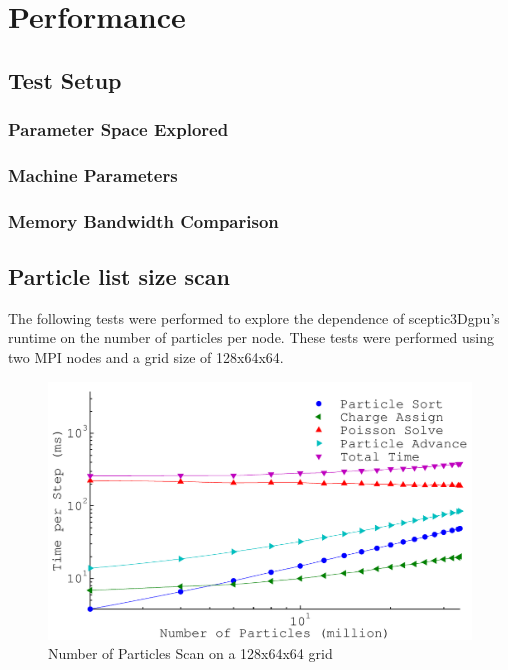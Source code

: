 \chapter{Performance} 

	\section{Test Setup}
		\subsection{Parameter Space Explored}
		\subsection{Machine Parameters}
		\subsection{Memory Bandwidth Comparison}
	
	\section{Particle list size scan}
The following tests were performed to explore the dependence of sceptic3Dgpu's runtime on the number of particles per node. These tests were performed using two MPI nodes and a grid size of 128x64x64.

\begin{figure}
\begin{center}
\includegraphics[width=6in]{performance/nptclsize_scan128x64x64ons8bins.pdf}
\end{center}
\caption{Number of Particles Scan on a 128x64x64 grid}
\label{fig:nptclsize_scan128x64x64}
\end{figure}

